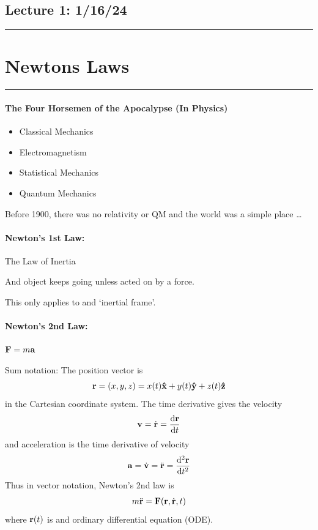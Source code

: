 \documentclass[../main.tex]{subfiles}
\begin{document}
\subsection*{Lecture 1: \hfill  1/16/24}
\hrule \vspace{10px}
\section{Newtons Laws}
\hrule \vspace{10px}

\paragraph{The Four Horsemen of the Apocalypse (In Physics)}
\begin{itemize}
    \item Classical Mechanics
    \item Electromagnetism
    \item Statistical Mechanics
    \item Quantum Mechanics
\end{itemize}

Before 1900, there was no relativity or QM and the world was a simple place \dots

\paragraph{Newton's 1st Law:} The Law of Inertia

And object keeps going unless acted on by a force.

This only applies to and `inertial frame'. 

\paragraph{Newton's 2nd Law:} $\vb{F} = m\vb{a}$

Sum notation: The position vector is
\[
    \vb{r} = (x, y, z) = x(t) \vu{x} + y(t) \vu{y} + z(t) \vu{z}
\] 
in the Cartesian coordinate system. The time derivative gives the velocity
\[
    \vb{v} = \dot{\vb{r}} = \dv{\vb{r}}{t}
\]
and acceleration is the time derivative of velocity
\begin{align*}
    \vb{a} = \dot{\vb{v}} = \ddot{\vb{r}} = \dv[2]{\vb{r}}{t}
\end{align*}
Thus in vector notation, Newton's 2nd law is
\begin{align*}
    m\ddot{\vb{r}} = \vb{F}(\vb{r}, \dot{\vb{r}}, t)
\end{align*}
where $\vb{r}(t)$ is and ordinary differential equation (ODE).
\end{document}
